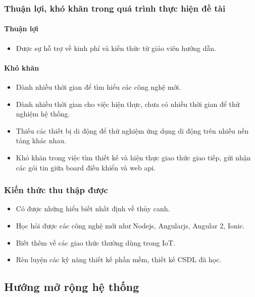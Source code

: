 \documentclass[a4paper,12pt,oneside]{article}
\begin{document}
	\subsubsection{Thuận lợi, khó khăn trong quá trình thực hiện đề tài}	
	\paragraph{Thuận lợi}
		\begin{itemize}
		\item Được sự hỗ trợ về kinh phí và kiến thức từ giáo viên hướng dẫn. 
		\end{itemize}
	\paragraph{Khó khăn}
		\begin{itemize}
		\item Dành nhiều thời gian để tìm hiểu các công nghệ mới. 

		\item Dành nhiều thời gian cho việc hiện thực, chưa có nhiều thời gian để thử nghiệm hệ thống. 

		\item Thiếu các thiết bị di động để thử nghiệm ứng dụng di động trên nhiều nền tảng khác nhau. 

		\item  Khó khăn trong việc tìm thiết kế và hiện thực giao thức giao tiếp, gửi nhận các gói tin giữa board điều khiển và web api. 
		\end{itemize}

\subsubsection{Kiến thức thu thập được}
\begin{itemize}
\item Có được những hiểu biết nhất định về thủy canh. 

\item Học hỏi được các công nghệ mới như Nodejs, Angularjs, Angular 2, Ionic. 

\item Biết thêm về các giao thức thường dùng trong IoT. 

\item Rèn luyện các kỹ năng thiết kế phần mềm, thiết kế CSDL đã học. 
\end{itemize}

	
\subsection{Hướng mở rộng hệ thống}
\end{document}
